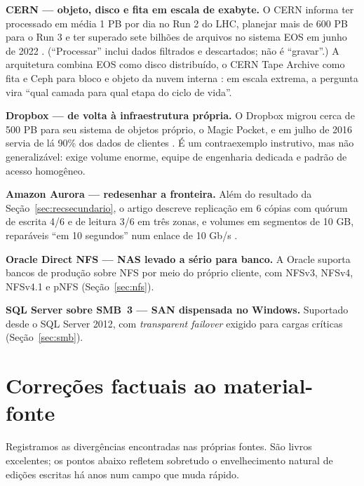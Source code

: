 \documentclass[11pt,a4paper]{article}
\begin{document}
\textbf{CERN --- objeto, disco e fita em escala de exabyte.} O CERN informa ter processado em média
1 PB por dia no Run 2 do LHC, planejar mais de 600 PB para o Run 3 e ter superado sete bilhões de arquivos
no sistema EOS em junho de 2022 \cite{cernstorage}. (``Processar'' inclui dados filtrados e descartados;
não é ``gravar''.) A arquitetura combina EOS como disco distribuído, o CERN Tape Archive como fita e Ceph
para bloco e objeto da nuvem interna \cite{cerncta}: em escala extrema, a pergunta vira ``qual camada para
qual etapa do ciclo de vida''.

\textbf{Dropbox --- de volta à infraestrutura própria.} O Dropbox migrou cerca de 500 PB para seu sistema
de objetos próprio, o Magic Pocket, e em julho de 2016 servia de lá 90\% dos dados de clientes
\cite{dropboxmp}. É um contraexemplo instrutivo, mas não generalizável: exige volume enorme, equipe de
engenharia dedicada e padrão de acesso homogêneo.

\textbf{Amazon Aurora --- redesenhar a fronteira.} Além do resultado da Seção~\ref{sec:recsecundario}, o
artigo descreve replicação em 6 cópias com quórum de escrita 4/6 e de leitura 3/6 em três zonas, e
volumes em segmentos de 10 GB, reparáveis ``em 10 segundos'' num enlace de 10 Gb/s \cite{aurora2017}.

\textbf{Oracle Direct NFS --- NAS levado a sério para banco.} A Oracle suporta bancos de produção sobre
NFS por meio do próprio cliente, com NFSv3, NFSv4, NFSv4.1 e pNFS \cite{oracledn} (Seção~\ref{sec:nfs}).

\textbf{SQL Server sobre SMB~3 --- SAN dispensada no Windows.} Suportado desde o SQL Server 2012, com
\textit{transparent failover} exigido para cargas críticas \cite{mssqlsmb} (Seção~\ref{sec:smb}).

\section{Correções factuais ao material-fonte}
\label{sec:correcoes}

Registramos as divergências encontradas nas próprias fontes. São livros excelentes; os pontos abaixo
refletem sobretudo o envelhecimento natural de edições escritas há anos num campo que muda rápido.
\end{document}
